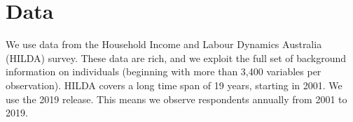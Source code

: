 \documentclass[12pt, a4paper]{article}
\begin{document}
%
%
%
%

\section{Data}

We use data from the Household Income and Labour Dynamics Australia (HILDA)
survey. These data are rich, and we exploit the full set of background
information on individuals (beginning with more than 3,400 variables per
observation). HILDA covers a long time span of 19 years, starting in 2001. We use the 2019 release. This means we observe respondents annually from 2001 to 2019.
\end{document}
